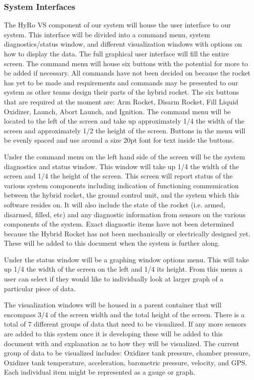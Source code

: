 \documentclass[10pt,draftclsnofoot,onecolumn,compsoc]{IEEEtran}
\begin{document}
\subsubsection{System Interfaces}
The HyRo VS component of our system will house the user interface to our system. This interface will be divided into a command menu, system diagnostics/status window, and different visualization windows with options on how to display the data. The full graphical user interface will fill the entire screen. The command menu will house six buttons with the potential for more to be added if necessary. All commands have not been decided on because the rocket has yet to be made and requirements and commands may be presented to our system as other teams design their parts of the hybrid rocket.  The six buttons that are required at the moment are: Arm Rocket, Disarm Rocket, Fill Liquid Oxidizer, Launch, Abort Launch, and Ignition. The command menu will be located to the left of the screen and take up approximately 1/4 the width of the screen and approximately 1/2 the height of the screen. Buttons in the menu will be evenly spaced and use around a size 20pt font for text inside the buttons. \par
	Under the command menu on the left hand side of the screen will be the system diagnostics and status window. This window will take up 1/4 the width of the screen and 1/4 the height of the screen. This screen will report status of the various system components including indication of functioning communication between the hybrid rocket, the ground control unit, and the system which this software resides on. It will also include the state of the rocket (i.e. armed, disarmed, filled, etc) and any diagnostic information from sensors on the various components of the system. Exact diagnostic items have not been determined because the Hybrid Rocket has not been mechanically or electrically designed yet. These will be added to this document when the system is further along.\par 
	Under the status window will be a graphing window options menu. This will take up 1/4 the width of the screen on the left and 1/4 its height. From this menu a user can select if they would like to individually look at larger graph of a particular piece of data. \par
	The visualization windows will be housed in a parent container that will encompass 3/4 of the screen width and the total height of the screen. There is a total of 7 different groups of data that need to be visualized.  If any more sensors are added to this system once it is developing these will be added to this document with and explanation as to how they will be visualized.  The current group of data to be visualized includes:  Oxidizer tank pressure, chamber pressure, Oxidizer tank temperature, acceleration, barometric pressure, velocity, and GPS.   Each individual item might be represented as a gauge or graph.\par
	
\end{document}

